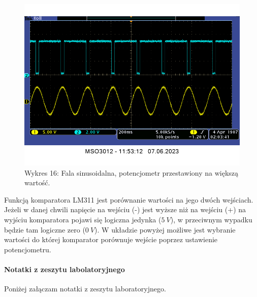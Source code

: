 \documentclass[14pt, table]{extarticle}
\begin{document}
\begin{figure}[H]
\includegraphics[width=12cm]{A23}
\centering
\captionsetup{labelformat=empty}
\caption{Wykres 16: Fala sinusoidalna, potencjometr przestawiony na większą wartość.}
\end{figure}

Funkcją komparatora LM311 jest porównanie wartości na jego dwóch wejściach. Jeżeli w danej chwili napięcie na wejściu (-) jest wyższe niż na wejściu (+) na wyjściu komparatora pojawi się logiczna jedynka ($5 \ V$), w przeciwnym wypadku będzie tam logiczne zero ($0 \ V$). W układzie powyżej możliwe jest wybranie wartości do której komparator porównuje wejście poprzez ustawienie potencjometru.

\newpage
\paragraph{Notatki z zeszytu labolatoryjnego \\}
Poniżej załączam notatki z zeszytu laboratoryjnego.
\end{document}
